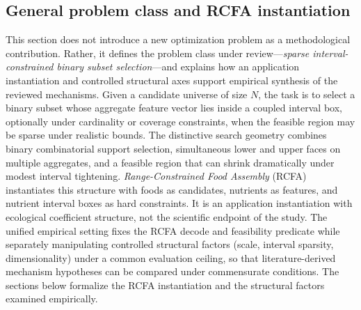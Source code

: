 \documentclass[lettersize,journal]{IEEEtran}
\begin{document}
\subsection{General problem class and RCFA instantiation}
This section does not introduce a new optimization problem as a methodological contribution.
Rather, it defines the problem class under review---\emph{sparse interval-constrained binary subset selection}---and explains how an application instantiation and controlled structural axes support empirical synthesis of the reviewed mechanisms.
Given a candidate universe of size $N$, the task is to select a binary subset whose aggregate feature vector lies inside a coupled interval box, optionally under cardinality or coverage constraints, when the feasible region may be sparse under realistic bounds.
The distinctive search geometry combines binary combinatorial support selection, simultaneous lower and upper faces on multiple aggregates, and a feasible region that can shrink dramatically under modest interval tightening.
\emph{Range-Constrained Food Assembly} (RCFA) instantiates this structure with foods as candidates, nutrients as features, and nutrient interval boxes as hard constraints.
It is an application instantiation with ecological coefficient structure, not the scientific endpoint of the study.
The unified empirical setting fixes the RCFA decode and feasibility predicate while separately manipulating controlled structural factors (scale, interval sparsity, dimensionality) under a common evaluation ceiling, so that literature-derived mechanism hypotheses can be compared under commensurate conditions.
The sections below formalize the RCFA instantiation and the structural factors examined empirically.
\end{document}
